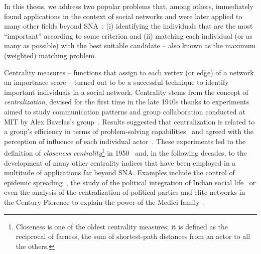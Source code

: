 In this thesis, we address two popular problems that, among others, immediately
found applications in the context of social networks and were later applied to
many other fields beyond SNA~\cite{DBLP:journals/jis/OtteR02}: (i) identifying the
individuals that are the most \enquote{important} according to some criterion
and (ii) matching each individual (or as many as possible) with the best
suitable candidate -- also known as the maximum (weighted) matching problem.

Centrality measures -- \ie functions that assign to each vertex (or edge) of a
network an importance score -- turned out to be a successful technique to
identify important individuals in a social network.
Centrality stems from the concept of \emph{centralization}, devised for the
first time in the late 1940s thanks to experiments aimed to study communication
patterns and group collaboration conducted at MIT by Alex Bavelas's
group~\cite{bavelas1948mathematical}.
Results suggested that centralization is related to a group's efficiency in terms of
problem-solving capabilities~\cite[p. 45]{trahair1994aristotelian} and agreed
with the perception of influence of each individual
actor~\cite[p. 68]{DBLP:journals/socnet/Bernard05}. These experiments led to
the definition of
\emph{closeness centrality}\footnote{Closeness is one of the
oldest centrality measures; it is defined as the reciprocal of farness, \ie
the sum of shortest-path distances from an actor to all the others.}
in 1950~\cite{bavelas1950communication} and, in the following decades, to the
development of many other centrality indices that have been employed in
a multitude of applications far beyond SNA.
Examples include the control of epidemic
spreading~\cite{DBLP:journals/snam/Doostmohammadian20}, the study of the
political integration of Indian social life~\cite{cohn1958networks} or even the
analysis of the centralization of political parties and elite networks in the
 Century Florence to explain the power of the Medici
family~\cite{action1993rise}.

